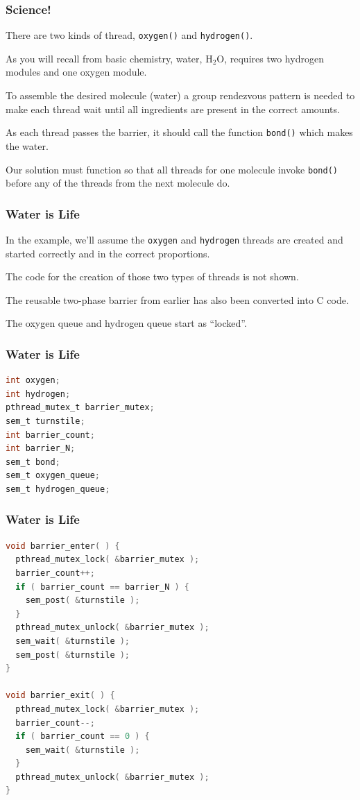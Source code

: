 \begin{frame}
\frametitle{Science!}

There are two kinds of thread, \texttt{oxygen()} and \texttt{hydrogen()}. 

As you will recall from basic chemistry, water, H$_{2}$O, requires two hydrogen modules and one oxygen module. 

To assemble the desired molecule (water) a group rendezvous pattern is needed to make each thread wait until all ingredients are present in the correct amounts.

As each thread passes the barrier, it should call the function \texttt{bond()} which makes the water. 

Our solution must function so that all threads for one molecule invoke \texttt{bond()} before any of the threads from the next molecule do. 

\end{frame}


\begin{frame}
\frametitle{Water is Life}

In the example, we'll assume the \texttt{oxygen} and \texttt{hydrogen} threads are created and started correctly and in the correct proportions. 

The code for the creation of those two types of threads is not shown. 

The reusable two-phase barrier from earlier has also been converted into C code.

The oxygen queue and hydrogen queue start as ``locked''.

\end{frame}

\begin{frame}[fragile]
\frametitle{Water is Life}

\begin{lstlisting}[language=C]
int oxygen;
int hydrogen;
pthread_mutex_t barrier_mutex;
sem_t turnstile;
int barrier_count;
int barrier_N;
sem_t bond;
sem_t oxygen_queue;
sem_t hydrogen_queue;
\end{lstlisting}
\end{frame}

\begin{frame}[fragile]
\frametitle{Water is Life}

\begin{lstlisting}[language=C]
void barrier_enter( ) {
  pthread_mutex_lock( &barrier_mutex );
  barrier_count++;
  if ( barrier_count == barrier_N ) {
    sem_post( &turnstile );
  }
  pthread_mutex_unlock( &barrier_mutex );
  sem_wait( &turnstile );
  sem_post( &turnstile );            
}

void barrier_exit( ) {
  pthread_mutex_lock( &barrier_mutex );
  barrier_count--;
  if ( barrier_count == 0 ) {
    sem_wait( &turnstile );
  }
  pthread_mutex_unlock( &barrier_mutex );
}
\end{lstlisting}

\end{frame}

